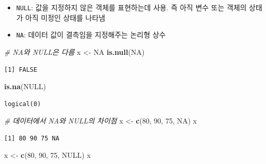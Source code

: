 \documentclass[
  11pt,
]{krantz}
\newenvironment{Shaded}{\begin{snugshade}}{\end{snugshade}}
\newcommand{\CommentTok}[1]{\textcolor[rgb]{0.37,0.37,0.37}{\textit{#1}}}
\newcommand{\DecValTok}[1]{\textcolor[rgb]{0.06,0.06,0.06}{#1}}
\newcommand{\KeywordTok}[1]{\textcolor[rgb]{0.27,0.27,0.27}{\textbf{#1}}}
\newcommand{\NormalTok}[1]{#1}
\newcommand{\OtherTok}[1]{\textcolor[rgb]{0.37,0.37,0.37}{#1}}
\newcommand{\StringTok}[1]{\textcolor[rgb]{0.5,0.5,0.5}{#1}}
\providecommand{\tightlist}{%
  \setlength{\itemsep}{0pt}\setlength{\parskip}{0pt}}
\begin{document}
\begin{itemize}
\tightlist
\item
  \texttt{NULL}: 값을 지정하지 않은 객체를 표현하는데 사용. 즉 아직 변수 또는 객체의 상태가 아직 미정인 상태를 나타냄
\item
  \texttt{NA}: 데이터 값이 결측임을 지정해주는 논리형 상수
\end{itemize}

\normalsize

\footnotesize

\begin{Shaded}
\begin{Highlighting}[]
\CommentTok{# NA와 NULL은 다름}
\NormalTok{x <-}\StringTok{ }\OtherTok{NA}
\KeywordTok{is.null}\NormalTok{(}\OtherTok{NA}\NormalTok{)}
\end{Highlighting}
\end{Shaded}

\begin{verbatim}
[1] FALSE
\end{verbatim}

\begin{Shaded}
\begin{Highlighting}[]
\KeywordTok{is.na}\NormalTok{(}\OtherTok{NULL}\NormalTok{)}
\end{Highlighting}
\end{Shaded}

\begin{verbatim}
logical(0)
\end{verbatim}

\begin{Shaded}
\begin{Highlighting}[]
\CommentTok{# 데이터에서 NA와 NULL의 차이점}
\NormalTok{x <-}\StringTok{ }\KeywordTok{c}\NormalTok{(}\DecValTok{80}\NormalTok{, }\DecValTok{90}\NormalTok{, }\DecValTok{75}\NormalTok{, }\OtherTok{NA}\NormalTok{)}
\NormalTok{x}
\end{Highlighting}
\end{Shaded}

\begin{verbatim}
[1] 80 90 75 NA
\end{verbatim}

\begin{Shaded}
\begin{Highlighting}[]
\NormalTok{x <-}\StringTok{ }\KeywordTok{c}\NormalTok{(}\DecValTok{80}\NormalTok{, }\DecValTok{90}\NormalTok{, }\DecValTok{75}\NormalTok{, }\OtherTok{NULL}\NormalTok{)}
\NormalTok{x}
\end{Highlighting}
\end{Shaded}
\end{document}
